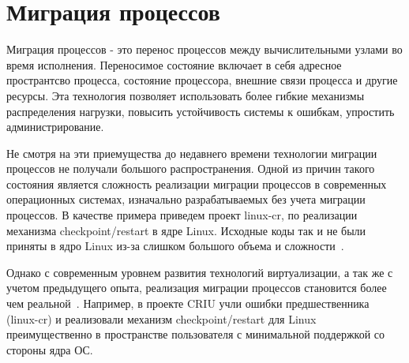 \section{Миграция процессов}

Миграция процессов - это перенос процессов между вычислительными узлами во время исполнения. Переносимое состояние включает в себя адресное пространтсво процесса, состояние процессора, внешние связи процесса и другие ресурсы. Эта технология позволяет использовать более гибкие механизмы распределения нагрузки, повысить устойчивость системы к ошибкам, упростить администрирование.

Не смотря на эти приемущества до недавнего времени технологии миграции процессов не получали большого распространения. Одной из причин такого состояния является сложность реализации миграции процессов в современных операционных системах, изначально разрабатываемых без учета миграции процессов. В качестве примера приведем проект linux-cr, по реализации механизма checkpoint/restart в ядре Linux. Исходные коды так и не были приняты в ядро Linux из-за слишком большого объема и сложности~\cite{CRCOMPLICATED}.

Однако с современным уровнем развития технологий виртуализации, а так же с учетом предыдущего опыта, реализация миграции процессов становится более чем реальной~\cite{CRIUPROPSAL}. Например, в проекте CRIU учли ошибки предшественника (linux-cr) и реализовали механизм checkpoint/restart для Linux преимущественно в пространстве пользователя с минимальной поддержкой со стороны ядра ОС.
